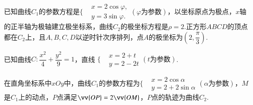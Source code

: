 \documentclass{BHCexam}
\begin{document}
\begin{questions}
\kongbai
\qs 已知曲线$C_1$的参数方程是$\Bigg\{\begin{aligned}
&x=2\cos\varphi,\\
&y=3\sin\varphi.
\end{aligned}(\varphi\text{为参数})$，以坐标原点为极点，$x$轴的正半轴为极轴建立极坐标系，曲线$C_2$的极坐标方程是$\rho=2$.正方形$ABCD$的顶点都在$C_2$上，且$A,B,C,D$以逆时针次序排列，点$A$的极坐标为$(2,\dfrac{\pi}{3})$.
\kongbai 
\qs 已知曲线$ C:\dfrac{x^2}{4}+\dfrac{y^2}{9}=1 $，直线 $\Bigg\{\begin{aligned}
&x=2+t\\
&y=2-2t
\end{aligned}(t\text{为参数}) $.
\kongbai
\qs 在直角坐标系中$ xOy $中，曲线$ C_1 $的参数方程为$\Bigg\{\begin{aligned}
&x=2\cos\alpha\\
&y=2+2\sin\alpha
\end{aligned}(\alpha\text{为参数})$，$ M $是$ C_1 $上的动点，$ P $点满足$ \vv{OP}=2\vv{OM} $，$ P $点的轨迹为曲线$ C_2 $.
\begin{parts}

\end{parts}
\end{questions}
\end{document}
